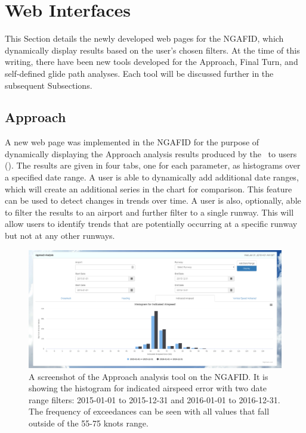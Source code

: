     
\section{Web Interfaces}

	This Section details the newly developed web pages for the NGAFID, which dynamically display results based on the user's chosen filters.  At the time of this writing, there have been new tools developed for the Approach, Final Turn, and self-defined glide path analyses.  Each tool will be discussed further in the subsequent Subsections.
    
    
    \subsection{Approach}
    
    	A new web page was implemented in the NGAFID for the purpose of dynamically displaying the Approach analysis results produced by the \toolname\ to users ().  The results are given in four tabs, one for each parameter, as histograms over a specified date range.  A user is able to dynamically add additional date ranges, which will create an additional series in the chart for comparison.  This feature can be used to detect changes in trends over time.  A user is also, optionally, able to filter the results to an airport and further filter to a single runway.  This will allow users to identify trends that are potentially occurring at a specific runway but not at any other runways.
    
    	\begin{figure}
    		\centering
            \includegraphics[width=\linewidth]{img/approach_tool_screenshot}
            \caption{A screenshot of the Approach analysis tool on the NGAFID.  It is showing the histogram for indicated airspeed error with two date range filters: 2015-01-01 to 2015-12-31 and 2016-01-01 to 2016-12-31.  The frequency of exceedances can be seen with all values that fall outside of the 55-75 knots range.}
            \label{fig:approach_tool_screenshot}
    	\end{figure}
    
